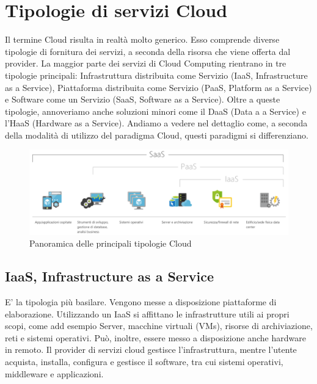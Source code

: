 \section{Tipologie di servizi Cloud}
Il termine Cloud risulta in realtà molto generico. Esso comprende diverse tipologie di fornitura dei servizi, a seconda della risorsa che viene offerta dal provider. La maggior parte dei servizi di Cloud Computing rientrano in tre tipologie principali: Infrastruttura distribuita come Servizio (IaaS, Infrastructure as a Service), Piattaforma distribuita come Servizio (PaaS, Platform as a Service) e Software come un Servizio (SaaS, Software as a Service). Oltre a queste tipologie, annoveriamo anche soluzioni minori come il DaaS (Data a a Service) e l'HaaS (Hardware as a Service). Andiamo a vedere nel dettaglio come, a seconda della modalità di utilizzo del paradigma Cloud, questi paradigmi si differenziano. 
\begin{figure}
	\centering
	\includegraphics[width=0.7\linewidth]{capitoli/imgs/TipologieCloud}
	\caption{Panoramica delle principali tipologie Cloud}
	\label{fig:tipologiecloud}
\end{figure}

\subsection{IaaS, Infrastructure as a Service}
E' la tipologia più basilare. Vengono messe a disposizione piattaforme di elaborazione. Utilizzando un IaaS si affittano le infrastrutture utili ai propri scopi, come add esempio Server, macchine virtuali (VMs), risorse di archiviazione, reti e sistemi operativi. Può, inoltre, essere messo a disposizione anche hardware in remoto. Il provider di servizi cloud gestisce l'infrastruttura, mentre l'utente acquista, installa, configura e gestisce il software, tra cui sistemi operativi, middleware e applicazioni.
